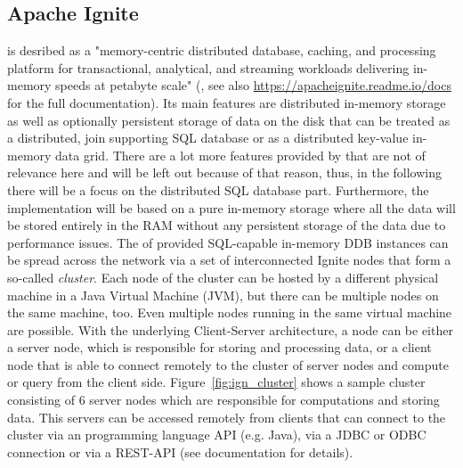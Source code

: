 
\subsection{Apache Ignite}
\label{sec:meth_ign}

 is desribed as a "memory-centric distributed database, caching, and processing platform for transactional, analytical, and streaming
workloads delivering in-memory speeds at petabyte scale" (, see also \url{https://apacheignite.readme.io/docs} for the full
documentation).
Its main features are distributed in-memory storage as well as optionally persistent storage of data on the disk that can be treated as a distributed, join
supporting SQL database or as a distributed key-value in-memory data grid. There are a lot more features provided by  that are not of
relevance here and will be left out because of that reason, thus, in the following there will be a focus on the distributed SQL database part.
Furthermore, the implementation will be based on a pure in-memory storage where all the data will be stored entirely in the RAM without any persistent 
storage of the data due to performance issues. The of  provided SQL-capable in-memory DDB instances can be spread across the network 
via a set of interconnected Ignite nodes that form a so-called \emph{cluster}. Each node of the cluster can be hosted by a different physical machine 
in a Java Virtual Machine (JVM), but there can be multiple nodes on the same machine, too. Even multiple nodes running in the same virtual machine are
possible. With the underlying Client-Server architecture, a node can be either a server node, which is responsible for storing and processing data, or a
client node that is able to connect remotely to the cluster of server nodes and compute or query from the client side. Figure~\ref{fig:ign_cluster} shows
a sample cluster consisting of 6 server nodes which are responsible for computations and storing data. This servers can be accessed remotely from clients
that can connect to the cluster via an programming language API (e.g. Java), via a JDBC or ODBC connection or via a REST-API (see documentation for
details). 

